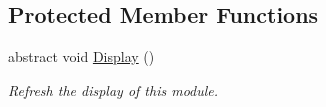 \subsection*{Protected Member Functions}
\begin{DoxyCompactItemize}
\item 
\hypertarget{class_m_b_c_1_1_app_1_1_terminal_1_1_terminal_module_a6194db09001eabda74aa66a3a507b0a4}{abstract void \hyperlink{class_m_b_c_1_1_app_1_1_terminal_1_1_terminal_module_a6194db09001eabda74aa66a3a507b0a4}{Display} ()}\label{class_m_b_c_1_1_app_1_1_terminal_1_1_terminal_module_a6194db09001eabda74aa66a3a507b0a4}

\begin{DoxyCompactList}\small\item\em Refresh the display of this module.\end{DoxyCompactList}\end{DoxyCompactItemize}

